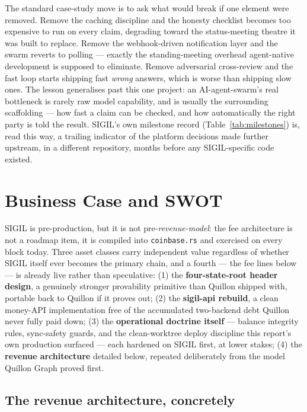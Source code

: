 The standard case-study move is to ask what would break if one element were removed. Remove the caching discipline and the honesty checklist becomes too expensive to run on every claim, degrading toward the status-meeting theatre it was built to replace. Remove the webhook-driven notification layer and the swarm reverts to polling --- exactly the standing-meeting overhead agent-native development is supposed to eliminate. Remove adversarial cross-review and the fast loop starts shipping fast \emph{wrong} answers, which is worse than shipping slow ones. The lesson generalises past this one project: an AI-agent-swarm's real bottleneck is rarely raw model capability, and is usually the surrounding scaffolding --- how fast a claim can be checked, and how automatically the right party is told the result. SIGIL's own milestone record (Table~\ref{tab:milestones}) is, read this way, a trailing indicator of the platform decisions made further upstream, in a different repository, months before any SIGIL-specific code existed.

\section{Business Case and SWOT}

SIGIL is pre-production, but it is not pre-\emph{revenue-model}: the fee architecture is not a roadmap item, it is compiled into \texttt{coinbase.rs} and exercised on every block today. Three asset classes carry independent value regardless of whether SIGIL itself ever becomes the primary chain, and a fourth --- the fee lines below --- is already live rather than speculative: (1) the \textbf{four-state-root header design}, a genuinely stronger provability primitive than Quillon shipped with, portable back to Quillon if it proves out; (2) the \textbf{sigil-api rebuild}, a clean money-API implementation free of the accumulated two-backend debt Quillon never fully paid down; (3) the \textbf{operational doctrine itself} --- balance integrity rules, sync-safety guards, and the clean-worktree deploy discipline this report's own production surfaced --- each hardened on SIGIL first, at lower stakes; (4) the \textbf{revenue architecture} detailed below, repeated deliberately from the model Quillon Graph proved first.

\subsection{The revenue architecture, concretely}

